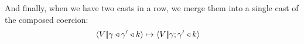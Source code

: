 \documentclass{article}
\begin{document}

And finally, when we have two casts in a row, we merge them into a single cast
of the composed coercion:
\begin{align*}
  \left\langle{V}\middle|\!\middle|{{\gamma}\triangleleft{{\gamma'}\triangleleft{k}}}\right\rangle
  &\mapsto
  \left\langle{V}\middle|\!\middle|{{\gamma; \gamma'}\triangleleft{k}}\right\rangle
\end{align*}
\end{document}
